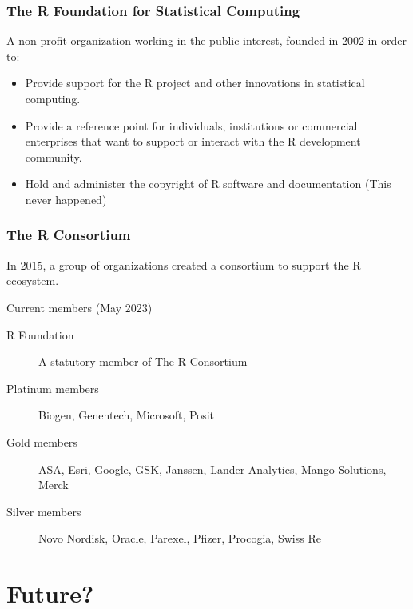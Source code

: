 \documentclass[svgnames, aspectratio=169]{beamer}
\begin{document}
  
  
  

\begin{frame}
  \frametitle{The R Foundation for Statistical Computing}

  A non-profit organization working in the public interest, founded
  in 2002 in order to:
  \begin{itemize}
  \item Provide support for the R project and other innovations in
    statistical computing.
  \item Provide a reference point for individuals, institutions or
    commercial enterprises that want to support or interact with the R
    development community.
  \item Hold and administer the copyright of R software and
    documentation (This never happened)
  \end{itemize}
  
\end{frame}
    
\begin{frame}
  \frametitle{The R Consortium}

  In 2015, a group of organizations created a consortium to support
  the R ecosystem.

  Current members (May 2023)
  \begin{description}
  \item [R Foundation] A statutory member of The R Consortium
  \item[Platinum members] Biogen, Genentech, Microsoft, Posit
  \item[Gold members] ASA, Esri, Google, GSK, Janssen, Lander
    Analytics, Mango Solutions, Merck
  \item[Silver members] Novo Nordisk, Oracle, Parexel, Pfizer,
    Procogia, Swiss Re
  \end{description}
  
\end{frame}

\section{Future?}
\end{document}
